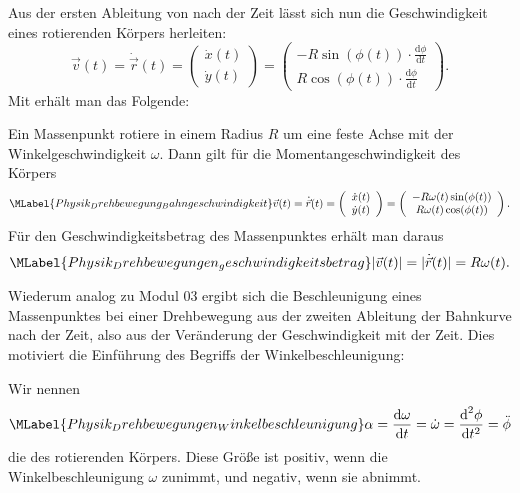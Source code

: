 \begin{MContent}
Aus der ersten Ableitung von  nach der Zeit l\"asst sich nun die Geschwindigkeit eines rotierenden K\"orpers herleiten:
$$
\vec{v}(t)=\dot{\vec{r}}(t)=\left(\begin{array}{c} \dot{x}(t) \\ \dot{y}(t) \end{array}\right)=\left(\begin{array}{c} -R\sin(\phi(t))\cdot\frac{\text{d}\phi}{\text{d}t} \\ R\cos(\phi(t))\cdot\frac{\text{d}\phi}{\text{d}t} \end{array}\right).
$$
Mit  erh\"alt man das Folgende:
\begin{MInfo}
Ein Massenpunkt rotiere in einem Radius $R$ um eine feste Achse mit der Winkelgeschwindigkeit $\omega$. Dann gilt f\"ur die Momentangeschwindigkeit des K\"orpers
\begin{equation}\MLabel{Physik_Drehbewegung_Bahngeschwindigkeit}
\vec{v}(t)=\dot{\vec{r}}(t)=\left(\begin{array}{c} \dot{x}(t) \\ \dot{y}(t) \end{array}\right)=\left(\begin{array}{c} -R\omega(t)\sin(\phi(t)) \\ R\omega(t)\cos(\phi(t)) \end{array}\right).\\
\end{equation}
F\"ur den Geschwindigkeitsbetrag des Massenpunktes erh\"alt man daraus
\begin{equation}\MLabel{Physik_Drehbewegungen_geschwindigkeitsbetrag}
\vert\vec{v}(t)\vert=\vert\dot{\vec{r}}(t)\vert=R\omega(t).
\end{equation}
\end{MInfo}

Wiederum analog zu Modul 03 ergibt sich die Beschleunigung eines Massenpunktes bei einer Drehbewegung aus der zweiten Ableitung der Bahnkurve nach der Zeit, also aus der Ver\"anderung der Geschwindigkeit mit der Zeit. Dies motiviert die Einf\"uhrung des Begriffs der Winkelbeschleunigung:

\begin{MInfo}
Wir nennen
\begin{equation}\MLabel{Physik_Drehbewegungen_Winkelbeschleunigung}
\alpha=\frac{\textrm{d}\omega}{\textrm{d}t}=\dot{\omega}=\frac{\textrm{d}^2\phi}{\textrm{d}t^2}=\ddot{\phi}
\end{equation}die  des rotierenden K\"orpers. Diese Gr\"o{\ss}e ist positiv, wenn die Winkelbeschleunigung $\omega$ zunimmt, und negativ, wenn sie abnimmt.\\


\end{MInfo}
\end{MContent}

